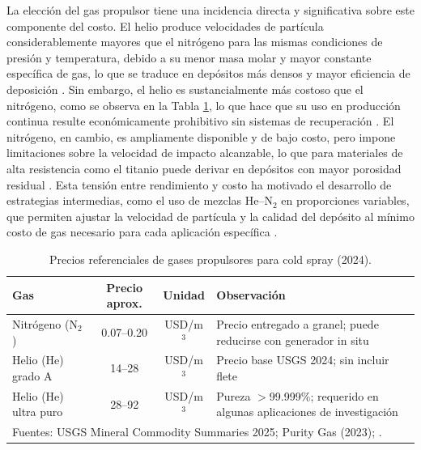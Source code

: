 La elección del gas propulsor tiene una incidencia directa y significativa 
sobre este componente del costo. El helio produce velocidades de partícula 
considerablemente mayores que el nitrógeno para las mismas condiciones de 
presión y temperatura, debido a su menor masa molar y mayor constante 
específica de gas, lo que se traduce en depósitos más densos y mayor 
eficiencia de deposición \cite{Stier2014}. Sin embargo, el helio es 
sustancialmente más costoso que el nitrógeno, como se observa en la Tabla \ref{tab:precios_gases}, lo que hace que su uso en 
producción continua resulte económicamente prohibitivo sin sistemas de 
recuperación \cite{Helfritch2015economics}. El nitrógeno, en cambio, es 
ampliamente disponible y de bajo costo, pero impone limitaciones sobre la 
velocidad de impacto alcanzable, lo que para materiales de alta resistencia 
como el titanio puede derivar en depósitos con mayor porosidad residual 
\cite{Moridi2014}. Esta tensión entre rendimiento y costo ha motivado el 
desarrollo de estrategias intermedias, como el uso de mezclas He--N$_2$ en 
proporciones variables, que permiten ajustar la velocidad de partícula y la 
calidad del depósito al mínimo costo de gas necesario para cada aplicación 
específica \cite{Stier2014, Helfritch2015economics, CerdaLobos2024}.

\begin{table}[h]
	\centering
	\caption{Precios referenciales de gases propulsores para cold spray (2024).}
	\label{tab:precios_gases}
	\begin{tabular}{lccp{6cm}}
		\hline
		\textbf{Gas} & \textbf{Precio aprox.} & \textbf{Unidad} & \textbf{Observación} \\
		\hline
		Nitrógeno (N$_2$) & 0.07--0.20   & USD/m$^3$ & Precio entregado a granel; 
		puede reducirse con generador 
		in situ \\
		Helio (He) grado A & 14--28       & USD/m$^3$ & Precio base USGS 2024; 
		sin incluir flete \\
		Helio (He) ultra puro & 28--92    & USD/m$^3$ & Pureza $>$99.999\%; 
		requerido en algunas 
		aplicaciones de investigación \\
		\hline
		\multicolumn{4}{l}{\footnotesize Fuentes: USGS Mineral Commodity Summaries 
			2025; Purity Gas (2023); \cite{Stier2014}.} \\
	\end{tabular}
\end{table}



